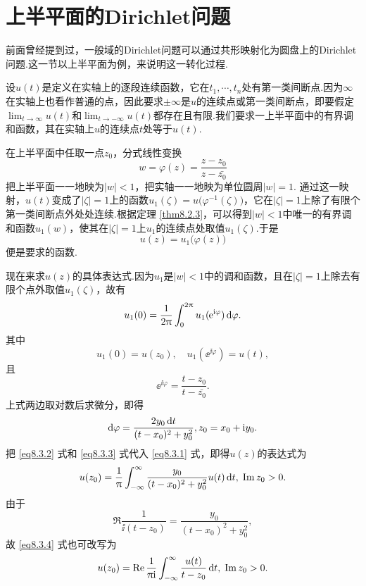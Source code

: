 \section{上半平面的Dirichlet问题\label{sec8.3}}
前面曾经提到过，一般域的Dirichlet问题可以通过共形映射化为圆盘上的Dirichlet问题.这一节以上半平面为例，来说明这一转化过程.

设$u(t)$是定义在实轴上的逐段连续函数，它在$t_1,\cdots,t_n$处有第一类间断点.因为$\infty$在实轴上也看作普通的点，因此要求$\pm\infty$是$u$的连续点或第一类间断点，即要假定$\lim_{t\to\infty}u(t)$和$\lim_{t\to-\infty}u(t)$都存在且有限.我们要求一上半平面中的有界调和函数，其在实轴上$u$的连续点$t$处等于$u(t)$.

在上半平面中任取一点$z_0$，分式线性变换
\[
  w = \varphi(z) = \frac{z-z_0}{z-\bar{z_0}}
\]
把上半平面一一地映为$|w|<1$，把实轴一一地映为单位圆周$|w|=1$. 通过这一映射，$u(t)$变成了$|\zeta|=1$上的函数$u_1(\zeta)=u\big(\varphi^{-1}(\zeta)\big)$，它在$|\zeta|=1$上除了有限个第一类间断点外处处连续.根据定理 \ref{thm8.2.3}，可以得到$|w|<1$中唯一的有界调和函数$u_1(w)$，使其在$|\zeta|=1$上$u_1$的连续点处取值$u_1(\zeta)$.于是
\[
  u(z) = u_1\big(\varphi(z)\big)
\]
便是要求的函数.

现在来求$u(z)$的具体表达式.因为$u_1$是$|w|<1$中的调和函数，且在$|\zeta|=1$上除去有限个点外取值$u_1(\zeta)$，故有
\begin{equation}\label{eq8.3.1}
  u_1(0) = \frac1{2\uppi}\int_0^{2\uppi}u_1(\operatorname{\!\!\;\mathrm e}^{\mathrm i\varphi})\mathop{}\!\mathrm{d} \varphi.
\end{equation}
其中
\begin{equation}\label{eq8.3.2}
  u_1(0) = u(z_0),\quad u_1(\ee^{\ii\varphi}) = u(t),
\end{equation}
且
\[
  \ee^{\ii\varphi} = \frac{t-z_0}{t-\bar{z_0}}.
\]
上式两边取对数后求微分，即得
\begin{equation}\label{eq8.3.3}
  \mathop{}\!\mathrm{d} \varphi = \frac{2y_0\mathop{}\!\mathrm{d} t}{(t-x_0)^2+y_0^2}, z_0 = x_0 + \mathrm i y_0.
\end{equation}
把 \eqref{eq8.3.2} 式和 \eqref{eq8.3.3} 式代入 \eqref{eq8.3.1} 式，即得$u(z)$的表达式为
\begin{equation}\label{eq8.3.4}
  u(z_0) = \frac1{\uppi}\int_{-\infty}^\infty\frac{y_0}{(t-x_0)^2+y_0^2}u(t)\mathop{}\!\mathrm{d} t,\;\operatorname{Im} z_0>0.
\end{equation}
由于
\[
  \Re\frac1{\ii(t-z_0)} = \frac{y_0}{(t-x_0)^2+y_0^2},
\]
故 \eqref{eq8.3.4} 式也可改写为
\begin{equation}\label{eq8.3.5}
  u(z_0) = \operatorname{Re}\frac1{\uppi\mathrm i}\int_{-\infty}^\infty\frac{u(t)}{t-z_0}\mathop{}\!\mathrm{d} t,\;\operatorname{Im} z_0>0.
\end{equation}


